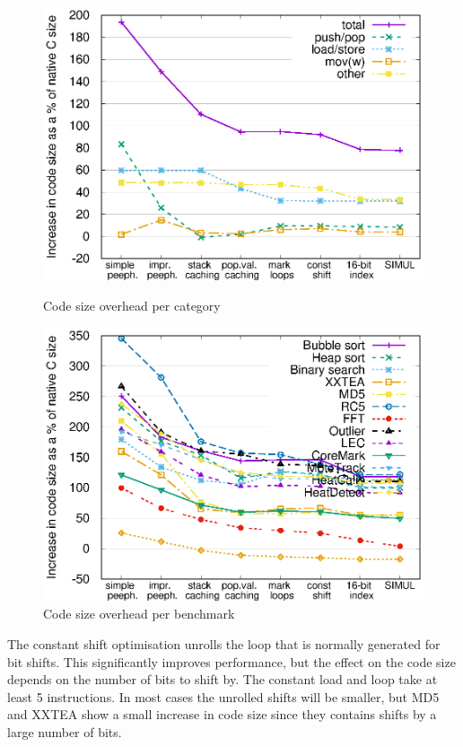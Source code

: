 \begin{figure}
 \centering
 \begin{minipage}{0.45\textwidth}
  \centering
  \includegraphics[width=\myfiguresizecodesize]{codesizeoverhead-per-opcode-category.eps}
  \caption{Code size overhead per category}
  \label{fig-codesize-per-opcode-category}
 \end{minipage}\hfill
 \begin{minipage}{0.45\textwidth}
  \centering
  \includegraphics[width=\myfiguresizecodesize]{codesizeoverhead-per-benchmark.eps}
  \caption{Code size overhead per benchmark}
  \label{fig-codesize-per-benchmark}
 \end{minipage}
\end{figure}

The constant shift optimisation unrolls the loop that is normally generated for bit shifts. This significantly improves performance, but the effect on the code size depends on the number of bits to shift by. The constant load and loop take at least 5 instructions. In most cases the unrolled shifts will be smaller, but MD5 and XXTEA show a small increase in code size since they contains shifts by a large number of bits.


